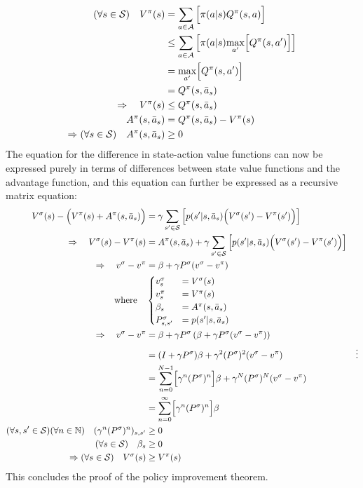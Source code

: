 \begin{align*}
    (\forall s\in\mathcal{S})\quad V^\pi(s) &= \sum_{a\in\mathcal{A}}{\Bigl[ \pi(a\vert s) Q^\pi(s, a) \Bigr]} \\
    &\le \sum_{a\in\mathcal{A}}{\left[ \pi(a\vert s) \underset{a'}{\operatorname{max}}\Bigl[ Q^\pi(s, a') \Bigr] \right]} \\
    &= \underset{a'}{\operatorname{max}}\Bigl[ Q^\pi(s, a') \Bigr] \\
    &= Q^\pi(s, \bar{a}_s) \\
    \Rightarrow\quad V^\pi(s) &\le Q^\pi(s, \bar{a}_s) \\
    A^\pi(s, \bar{a}_s) &= Q^\pi(s, \bar{a}_s) - V^\pi(s) \\
    \Rightarrow(\forall s\in\mathcal{S})\quad A^\pi(s, \bar{a}_s) &\ge 0
\end{align*}
The equation for the difference in state-action value functions can now be expressed purely in terms of differences between state value functions and the advantage function, and this equation can further be expressed as a recursive matrix equation:
\begin{align*}
    V^\sigma(s) - \Bigl(V^\pi(s) + A^\pi(s, \bar{a}_s)\Bigr) &= \gamma\sum_{s'\in\mathcal{S}}{\left[ p(s'\vert s, \bar{a}_s) \Bigl( V^\sigma(s') - V^\pi(s')\Bigr) \right]} \\
    \Rightarrow\quad V^\sigma(s) - V^\pi(s) &= A^\pi(s, \bar{a}_s) + \gamma\sum_{s'\in\mathcal{S}}{\left[ p(s'\vert s, \bar{a}_s) \Bigl( V^\sigma(s') - V^\pi(s')\Bigr) \right]} \\
    \Rightarrow\quad v^\sigma - v^\pi &= \beta + \gamma P^\sigma(v^\sigma - v^\pi) \\
    \text{where} \quad & \begin{cases}
        v^\sigma_s &= V^\sigma(s) \\
        v^\pi_s &= V^\pi(s) \\
        \beta_s &= A^\pi(s, \bar{a}_s) \\
        P^\sigma_{s, s'} &= p(s'\vert s, \bar{a}_s)
    \end{cases} \\
    \Rightarrow\quad v^\sigma - v^\pi &= \beta + \gamma P^\sigma\left(\beta + \gamma P^\sigma(v^\sigma - v^\pi)\right) \\
    &= (I + \gamma P^\sigma)\beta + \gamma^2 (P^\sigma)^2(v^\sigma - v^\pi)
    &\vdots \\
    &= \sum_{n=0}^{N-1} \Bigl[ \gamma^n (P^\sigma)^n \Bigr] \beta + \gamma^N (P^\sigma)^N (v^\sigma - v^\pi) \\
    &= \sum_{n=0}^{\infty} \Bigl[ \gamma^n (P^\sigma)^n \Bigr] \beta \\
    (\forall s,s'\in\mathcal{S})(\forall n\in\mathbb{N}) \quad (\gamma^n (P^\sigma)^n)_{s,s'} &\ge 0 \\
    (\forall s\in\mathcal{S}) \quad \beta_s &\ge 0 \\
    \Rightarrow (\forall s\in\mathcal{S}) \quad V^\sigma(s) &\ge V^\pi(s)
\end{align*}
This concludes the proof of the policy improvement theorem.
